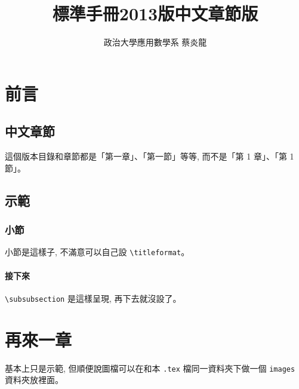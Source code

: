 \documentclass[12pt]{report}
\title{\bf{標準手冊2013版中文章節版}}
\author{政治大學應用數學系 蔡炎龍}
\begin{document}
\maketitle

\tableofcontents
\chapter{前言}
\section{中文章節}
這個版本目錄和章節都是「第一章」、「第一節」等等, 而不是「第 1 章」、「第 1 節」。

\section{示範}
\subsection{小節}
小節是這樣子, 不滿意可以自己設 \verb|\titleformat|。

\subsubsection{接下來}
\verb|\subsubsection| 是這樣呈現, 再下去就沒設了。

%
\chapter{再來一章}
基本上只是示範, 但順便說圖檔可以在和本 \verb|.tex| 檔同一資料夾下做一個 \verb|images| 資料夾放裡面。
\end{document}
